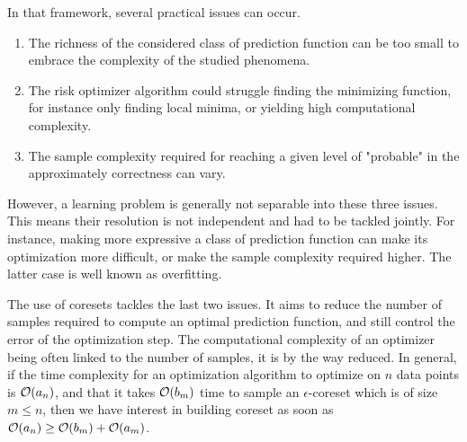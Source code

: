In that framework, several practical issues can occur. 
\begin{enumerate}
    \item The richness of the considered class of prediction function can be too small to embrace the complexity of the studied phenomena.
    \item The risk optimizer algorithm could struggle finding the minimizing function, for instance only finding local minima, or yielding high computational complexity.
    \item The sample complexity required for reaching a given level of "probable" in the approximately correctness can vary.
\end{enumerate}

However, a learning problem is generally not separable into these three issues. This means their resolution is not independent and had to be tackled jointly. For instance, making more expressive a class of prediction function can make its optimization more difficult, or make the sample complexity required higher. The latter case is well known as overfitting.


The use of coresets tackles the last two issues. It aims to reduce the number of samples required to compute an optimal prediction function, and still control the error of the optimization step. The computational complexity of an optimizer being often linked to the number of samples, it is by the way reduced. In general, if the time complexity for an optimization algorithm to optimize on $n$ data points is $\mathcal{O}(a_n)$, and that it takes $\mathcal{O}(b_m)$ time to sample an $\epsilon$-coreset which is of size $m \le n$, then we have interest in building coreset as soon as $\mathcal{O}(a_n) \geq \mathcal{O}(b_m) + \mathcal{O}(a_m)$.






